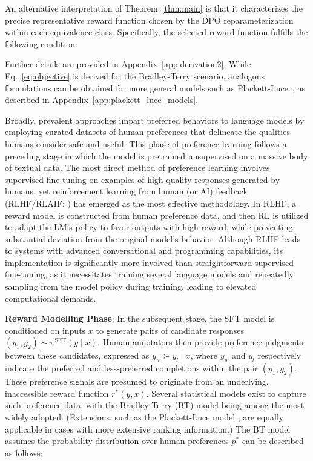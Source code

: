 An alternative interpretation of Theorem~\ref{thm:main} is that it characterizes the precise representative reward function chosen by the DPO reparameterization within each equivalence class. Specifically, the selected reward function fulfills the following condition:

Further details are provided in Appendix~\ref{app:derivation2}. While Eq.~\ref{eq:objective} is derived for the Bradley-Terry scenario, analogous formulations can be obtained for more general models such as Plackett-Luce~\citep{plackett1975analysis, luce2012individual}, as described in Appendix~\ref{app:plackett_luce_models}.

Broadly, prevalent approaches impart preferred behaviors to language models by employing curated datasets of human preferences that delineate the qualities humans consider safe and useful. This phase of preference learning follows a preceding stage in which the model is pretrained unsupervised on a massive body of textual data. The most direct method of preference learning involves supervised fine-tuning on examples of high-quality responses generated by humans, yet reinforcement learning from human (or AI) feedback (RLHF/RLAIF; \citep{christiano2017deep,bai2022constitutional}) has emerged as the most effective methodology. In RLHF, a reward model is constructed from human preference data, and then RL is utilized to adapt the LM’s policy to favor outputs with high reward, while preventing substantial deviation from the original model’s behavior. Although RLHF leads to systems with advanced conversational and programming capabilities, its implementation is significantly more involved than straightforward supervised fine-tuning, as it necessitates training several language models and repeatedly sampling from the model policy during training, leading to elevated computational demands.

\textbf{Reward Modelling Phase}: In the subsequent stage, the SFT model is conditioned on inputs $x$ to generate pairs of candidate responses $(y_1, y_2)\sim \pi^\text{SFT}(y \mid x)$. Human annotators then provide preference judgments between these candidates, expressed as $y_w\succ y_l \mid x$, where $y_w$ and $y_l$ respectively indicate the preferred and less-preferred completions within the pair $(y_1, y_2)$. These preference signals are presumed to originate from an underlying, inaccessible reward function $r^*(y, x)$. Several statistical models exist to capture such preference data, with the Bradley-Terry (BT) model \cite{bradley1952rankanalysis} being among the most widely adopted. (Extensions, such as the Plackett-Luce model \citep{plackett1975analysis, luce2012individual}, are equally applicable in cases with more extensive ranking information.) The BT model assumes the probability distribution over human preferences $p^*$ can be described as follows:

